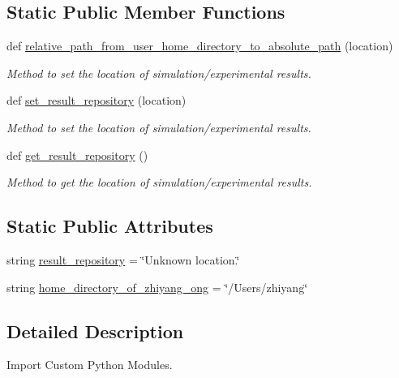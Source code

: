 \subsection*{Static Public Member Functions}
\begin{DoxyCompactItemize}
\item 
def \hyperlink{classutilities_1_1configuration__manager_1_1config__manager_a15f03ca784cab4d34b95dc020f3b0c23}{relative\+\_\+path\+\_\+from\+\_\+user\+\_\+home\+\_\+directory\+\_\+to\+\_\+absolute\+\_\+path} (location)
\begin{DoxyCompactList}\small\item\em Method to set the location of simulation/experimental results. \end{DoxyCompactList}\item 
def \hyperlink{classutilities_1_1configuration__manager_1_1config__manager_a3ac8c649652805fc0bddd2b6d8187329}{set\+\_\+result\+\_\+repository} (location)
\begin{DoxyCompactList}\small\item\em Method to set the location of simulation/experimental results. \end{DoxyCompactList}\item 
def \hyperlink{classutilities_1_1configuration__manager_1_1config__manager_a3e06a71db0338806c87430dc45fbab66}{get\+\_\+result\+\_\+repository} ()
\begin{DoxyCompactList}\small\item\em Method to get the location of simulation/experimental results. \end{DoxyCompactList}\end{DoxyCompactItemize}
\subsection*{Static Public Attributes}
\begin{DoxyCompactItemize}
\item 
string \hyperlink{classutilities_1_1configuration__manager_1_1config__manager_a19ed9ae453acea0ed85f704f18ee4b30}{result\+\_\+repository} = \char`\"{}Unknown location.\char`\"{}
\item 
string \hyperlink{classutilities_1_1configuration__manager_1_1config__manager_a884c4ec67676c35cc6fd674c208abfe2}{home\+\_\+directory\+\_\+of\+\_\+zhiyang\+\_\+ong} = \char`\"{}/Users/zhiyang\char`\"{}
\end{DoxyCompactItemize}


\subsection{Detailed Description}
Import Custom Python Modules. 

